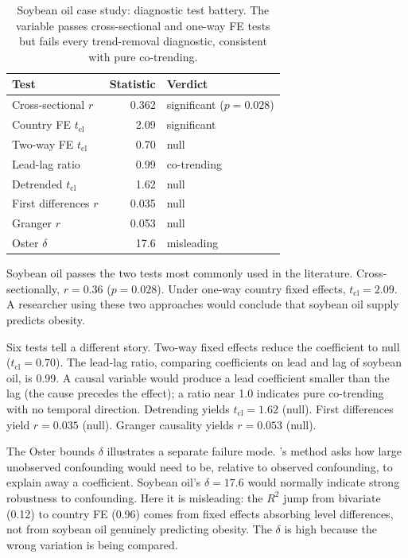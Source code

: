 \documentclass[letterpaper,11pt,leqno]{article}
\begin{document}
\begin{table}[htbp]
\caption{Soybean oil case study: diagnostic test battery. The variable passes cross-sectional and one-way FE tests but fails every trend-removal diagnostic, consistent with pure co-trending.}
\label{tab:soybean}
\begin{tabular*}{\textwidth}{@{\extracolsep\fill}lrl}
\toprule
Test & Statistic & Verdict \\
\midrule
Cross-sectional $r$ & 0.362 & significant ($p = 0.028$) \\
Country FE $t_{\text{cl}}$ & 2.09 & significant \\
Two-way FE $t_{\text{cl}}$ & 0.70 & null \\
Lead-lag ratio & 0.99 & co-trending \\
Detrended $t_{\text{cl}}$ & 1.62 & null \\
First differences $r$ & 0.035 & null \\
Granger $r$ & 0.053 & null \\
Oster $\delta$ & 17.6 & misleading \\
\bottomrule
\end{tabular*}
\end{table}

Soybean oil passes the two tests most commonly used in the literature. Cross-sectionally, $r = 0.36$ ($p = 0.028$). Under one-way country fixed effects, $t_{\text{cl}} = 2.09$. A researcher using these two approaches would conclude that soybean oil supply predicts obesity.

Six tests tell a different story. Two-way fixed effects reduce the coefficient to null ($t_{\text{cl}} = 0.70$). The lead-lag ratio, comparing coefficients on lead and lag of soybean oil, is 0.99. A causal variable would produce a lead coefficient smaller than the lag (the cause precedes the effect); a ratio near 1.0 indicates pure co-trending with no temporal direction. Detrending yields $t_{\text{cl}} = 1.62$ (null). First differences yield $r = 0.035$ (null). Granger causality yields $r = 0.053$ (null).

The Oster bounds $\delta$ illustrates a separate failure mode. \citeauthor{oster2019}'s method \citep{oster2019} asks how large unobserved confounding would need to be, relative to observed confounding, to explain away a coefficient. Soybean oil's $\delta = 17.6$ would normally indicate strong robustness to confounding. Here it is misleading: the $R^2$ jump from bivariate (0.12) to country FE (0.96) comes from fixed effects absorbing level differences, not from soybean oil genuinely predicting obesity. The $\delta$ is high because the wrong variation is being compared.
\end{document}
